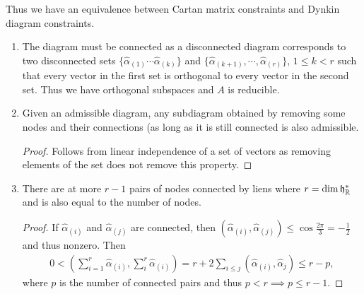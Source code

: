  Thus we have an equivalence between Cartan matrix constraints and Dynkin diagram constraints.
 \begin{enumerate}[label=\roman*)]
     \item The diagram must be connected as a disconnected diagram corresponds to two disconnected sets $\{\hat{\alpha}_{\left( 1 \right) } \cdots \hat{\alpha}_{\left( k \right) }\} $ and $\{\hat{\alpha}_{\left( k + 1 \right) }, \cdots, \hat{\alpha}_{\left( r \right) }\}$, $1 \leq k < r$ such that every vector in the first set is orthogonal to every vector in the second set. Thus we have orthogonal subspaces and $A$ is reducible.
     \item 
         \begin{claim}
             Given an admissible diagram, any subdiagram obtained by removing some nodes and their connections (as long as it is still connected is also admissible.
         \end{claim}
         \begin{proof}
             Follows from linear independence of a set of vectors as removing elements of the set does not remove this property.
         \end{proof}
         \item
             \begin{claim}
                 There are at more $r -1$ pairs of nodes connected by liens where $r = \dim \mathfrak{h}^{*}_{\mathbb{R}}$ and is also equal to the number of nodes.
             \end{claim}
             \begin{proof}
                 If $\hat{\alpha}_{\left( i \right) }$ and $\hat{\alpha}_{\left( j \right) }$ are connected, then $\left( \hat{\alpha}_{\left( i \right) }, \hat{\alpha}_{\left( j \right) } \right) \leq \cos \frac{2\pi}{3} = -\frac{1}{2}$ and thus nonzero. Then
                 \begin{align}
                     0 < \left( \sum_{i=1}^{r}  \hat{\alpha}_{\left( i \right) }, \sum_{i}^{r}  \hat{\alpha}_{\left( i \right) } \right) = r + 2 \sum_{i \leq j}^{}  \left( \hat{\alpha}_{\left( i \right) }, \hat{\alpha}_{j} \right)   \leq r - p
                 ,\end{align}
                 where $p$ is the number of connected pairs and thus $p < r \implies p \leq r - 1$.


\end{proof}
\end{enumerate}

